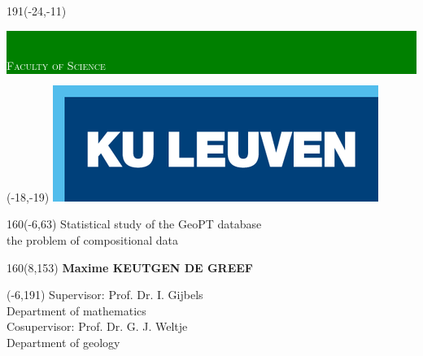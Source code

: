\thispagestyle{empty}
\newcommand{\form}[1]{\scalebox{1.087}{\boldmath{#1}}}
\sffamily
%
\begin{textblock}{191}(-24,-11)
\colorbox{green}{\hspace{123mm}\ \parbox[c][18truemm]{68mm}{\textcolor{white}{\Large \textsc{Faculty of Science}}}}
\end{textblock}
%
\begin{textblock}{70}(-18,-19)
\textblockcolour{}
\includegraphics*[height=19.8truemm]{Figures/LogoKULeuven}
\end{textblock}
%
\begin{textblock}{160}(-6,63)
\textblockcolour{}
\vspace{-\parskip}
\flushleft
\fontsize{40}{42}\selectfont \textcolor{bluetitle}{Statistical study of the GeoPT database}\\[1.5mm]
\fontsize{20}{22}\selectfont the problem of compositional data 
\end{textblock}
%
%
\begin{textblock}{160}(8,153)
\textblockcolour{}
\vspace{-\parskip}
\flushright
\fontsize{14}{16}\selectfont \textbf{Maxime KEUTGEN DE GREEF}
\end{textblock}
%
\begin{textblock}{70}(-6,191)
\textblockcolour{}
\vspace{-\parskip}
\flushleft
Supervisor: Prof. Dr. I. Gijbels\\[-2pt]
\textcolor{blueaff}{Department of mathematics}\\[5pt]
Cosupervisor: Prof. Dr. G. J. Weltje \\[-2pt]
\textcolor{blueaff}{Department of geology}\\[5pt]

\end{textblock}
